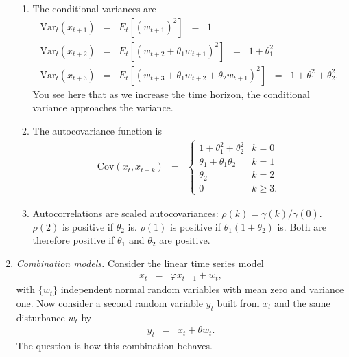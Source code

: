 \documentclass[11pt]{article}
\begin{document}
\begin{enumerate}
\begin{enumerate}
\item The conditional variances are
\begin{eqnarray*}
   \mbox{Var}_t ( x_{t+1}) &=& E_t [(w_{t+1})^2]
        \;\;=\;\; 1  \\
   \mbox{Var}_t ( x_{t+2}) &=& E_t [(w_{t+2} + \theta_1 w_{t+1})^2]
        \;\;=\;\; 1  + \theta_1^2 \\
   \mbox{Var}_t ( x_{t+3}) &=& E_t [(w_{t+3} + \theta_1 w_{t+2} + \theta_2 w_{t+1})^2]
        \;\;=\;\; 1  + \theta_1^2 + \theta_2^2 .
\end{eqnarray*}
You see here that as we increase the time horizon,
the conditional variance approaches the variance.

\item The autocovariance function is
\begin{eqnarray*}
    \mbox{Cov}(x_t,x_{t-k}) &=&
            \left\{
            \begin{array}{ll}
            1 + \theta_1^2 + \theta_2^2 & k=0 \\
            \theta_1 + \theta_1 \theta_2 & k=1 \\
            \theta_2                    & k=2 \\
            0                           & k \geq 3 .
            \end{array}
            \right.
\end{eqnarray*}
\item Autocorrelations are scaled autocovariances:
$\rho(k) = \gamma(k)/\gamma(0)$.
$\rho(2)$ is positive if $\theta_2$ is.
$\rho(1)$ is positive if $\theta_1 (1+\theta_2)$ is.
Both are therefore positive if $\theta_1$ and $\theta_2$ are
positive.
\end{enumerate}

\item {\it Combination models.\/}
Consider the linear time series model
\begin{eqnarray*}
    x_{t} &=& \varphi x_{t-1} +  w_t ,
\end{eqnarray*}
with $\{ w_t \}$ independent normal random variables with mean zero and variance one.
Now consider a second random variable $y_t$ built from $x_t$ and
the same disturbance $w_t$ by
\begin{eqnarray*}
    y_{t} &=& x_{t} + \theta w_t .
\end{eqnarray*}
The question is how this combination behaves.


\end{enumerate}
\end{document}
